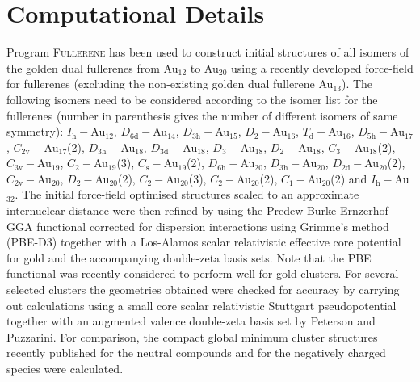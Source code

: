 \section{Computational Details}

Program \textsc{Fullerene}\autocite{Schwerdtfeger_Programfullerenesoftware_2013}
has been used to construct initial structures of all isomers of the golden dual
fullerenes from Au$_{12}$ to Au$_{20}$ using a recently developed force-field
for fullerenes\autocite{Wirz_smallfullerenesgraphene_2015} (excluding the
non-existing golden dual fullerene Au$_{13}$). The following isomers need to be
considered according to the isomer list for the fullerenes (number in
parenthesis gives the number of different isomers of same
symmetry):\autocite{Brinkmann_HouseGraphsdatabase_2013,Schwerdtfeger_Programfullerenesoftware_2013}
$I_\mathrm{h}-$Au$_{12}$, $D_\mathrm{6d}-$Au$_{14}$, $D_\mathrm{3h}-$Au$_{15}$,
$D_\mathrm{2}-$Au$_{16}$, $T_\mathrm{d}-$Au$_{16}$, $D_\mathrm{5h}-$Au$_{17}$,
$C_\mathrm{2v}-$Au$_{17}$(2), $D_\mathrm{3h}-$Au$_{18}$,
$D_\mathrm{3d}-$Au$_{18}$, $D_\mathrm{3}-$Au$_{18}$, $D_\mathrm{2}-$Au$_{18}$,
$C_\mathrm{3}-$Au$_{18}$(2), $C_\mathrm{3v}-$Au$_{19}$,
$C_\mathrm{2}-$Au$_{19}$(3), $C_\mathrm{s}-$Au$_{19}$(2),
$D_\mathrm{6h}-$Au$_{20}$, $D_\mathrm{3h}-$Au$_{20}$,
$D_\mathrm{2d}-$Au$_{20}$(2), $C_\mathrm{2v}-$Au$_{20}$,
$D_\mathrm{2}-$Au$_{20}$(2), $C_\mathrm{2}-$Au$_{20}$(3),
$C_\mathrm{2}-$Au$_{20}$(2), $C_\mathrm{1}-$Au$_{20}$(2) and
$I_\mathrm{h}-$Au$_{32}$. The initial force-field optimised structures scaled to
an approximate internuclear distance were then refined by using the
Predew-Burke-Ernzerhof \ac{GGA}
functional\autocite{Perdew_GeneralizedGradientApproximation_1996,Perdew_GeneralizedGradientApproximation_1997}
corrected for dispersion interactions using Grimme's method
(PBE-D3)\autocite{Grimme_consistentaccurateinitio_2010,Grimme_Effectdampingfunction_2011}
together with a Los-Alamos scalar relativistic effective core potential for gold
and the accompanying double-zeta basis sets.\autocite{Wadt1985} Note that the
PBE functional was recently considered to perform well for gold
clusters.\autocite{Mancera_alternativemethodologyassess_2015} For several
selected clusters the geometries obtained were checked for accuracy by carrying
out calculations using a small core scalar relativistic Stuttgart
pseudopotential\autocite{Figgen_Energyconsistentpseudopotentialsgroup_2005}
together with an augmented valence double-zeta basis set by Peterson and
Puzzarini.\autocite{Peterson-2005} For comparison, the compact global minimum
cluster structures recently published for the neutral
compounds\autocite{Assadollahzadeh_systematicsearchminimum_2009} and for the
negatively charged
species\autocite{Schooss_Determiningsizedependentstructure_2010,Lechtken_Structuredeterminationgold_2009}
were calculated.

